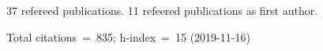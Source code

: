 37 refereed publications. 11 refeered publications as first author.

Total citations~=~835; h-index~=~15 (2019-11-16)